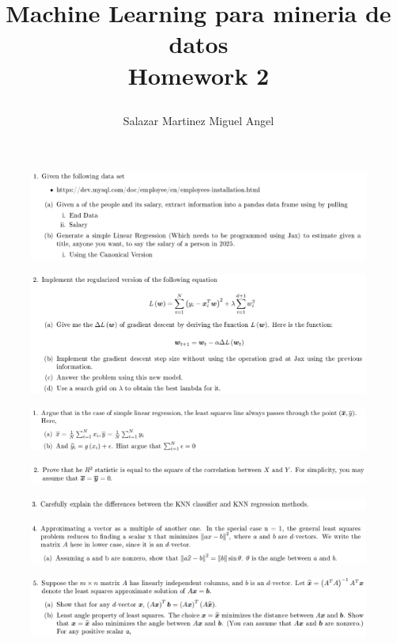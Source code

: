 \documentclass[12pt]{report}
\title{
	\begin{center}
		Machine Learning para mineria de datos\\
		Homework 2
		
	\end{center}
}
\author{Salazar Martinez Miguel Angel}
\begin{document}
	\renewcommand{\arraystretch}{1.3}
	
	\maketitle
	
\begin{figure}[H]
	\centering
	\includegraphics[width=1\textwidth]{screenshot001}
\end{figure}

\begin{figure}[H]
	\centering
	\includegraphics[width=1\textwidth]{screenshot002}
\end{figure}

\begin{figure}[H]
	\centering
	\includegraphics[width=1\textwidth]{screenshot003}
\end{figure}

\begin{figure}[H]
	\centering
	\includegraphics[width=1\textwidth]{screenshot004}
\end{figure}


\begin{figure}[H]
	\centering
	\includegraphics[width=1\textwidth]{screenshot008}
\end{figure}

\begin{figure}[H]
	\centering
	\includegraphics[width=1\textwidth]{screenshot006}
\end{figure}

\begin{figure}[H]
	\centering
	\includegraphics[width=1\textwidth]{screenshot007}
\end{figure}

\printbibliography
\end{document}
